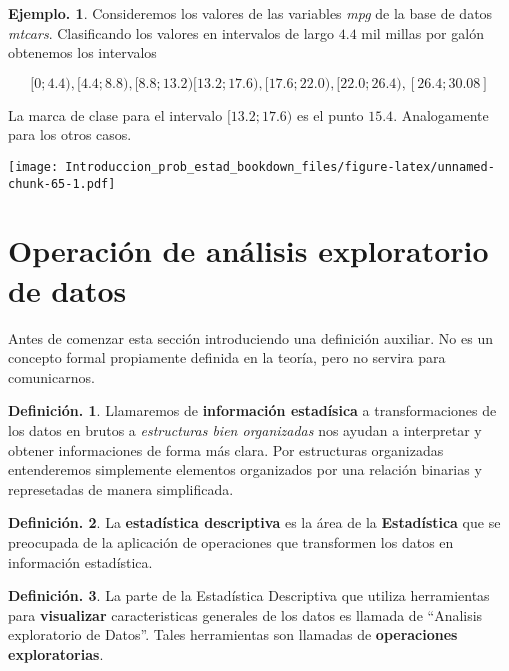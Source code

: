 \documentclass[]{book}
\theoremstyle{definition}
\newtheorem{definition}{Definición.}[chapter]
\theoremstyle{definition}
\newtheorem{example}{Ejemplo.}[chapter]
\theoremstyle{definition}
\theoremstyle{remark}
\begin{document}
\begin{example}
\protect\hypertarget{exm:unnamed-chunk-64}{}{\label{exm:unnamed-chunk-64} }Consideremos los valores de las variables \emph{mpg} de la
base de datos \emph{mtcars}. Clasificando los
valores en intervalos de largo \(4.4\) mil millas por galón
obtenemos los intervalos

\[ [0 ; 4.4), [4.4 ; 8.8), [8.8 ; 13.2) [13.2 ; 17.6),
[17.6 ; 22.0), [22.0 ; 26.4), [26.4 ; 30.08] \]

La marca de clase para el intervalo \([13.2 ; 17.6)\) es
el punto \(15.4\). Analogamente para los
otros casos.
\end{example}

\texttt{[image: Introduccion\_prob\_estad\_bookdown\_files/figure-latex/unnamed-chunk-65-1.pdf]}

\hypertarget{operaciuxf3n-de-anuxe1lisis-exploratorio-de-datos}{%
\section{Operación de análisis exploratorio de datos}\label{operaciuxf3n-de-anuxe1lisis-exploratorio-de-datos}}

Antes de comenzar esta sección introduciendo una definición auxiliar. No es un concepto formal propiamente definida en la teoría, pero no servira para comunicarnos.

\begin{definition}
\protect\hypertarget{def:unnamed-chunk-66}{}{\label{def:unnamed-chunk-66} }
Llamaremos de \textbf{información estadísica} a transformaciones de los datos en
brutos a \emph{estructuras bien organizadas} nos ayudan a interpretar y obtener
informaciones de forma más clara. Por estructuras organizadas entenderemos
simplemente elementos organizados por una relación binarias y represetadas de
manera simplificada.
\end{definition}

\begin{definition}
\protect\hypertarget{def:unnamed-chunk-67}{}{\label{def:unnamed-chunk-67} }
La \textbf{estadística descriptiva} es la área de la
\textbf{Estadística} que se preocupada de la
aplicación de operaciones que transformen
los datos en información estadística.
\end{definition}

\begin{definition}
\protect\hypertarget{def:unnamed-chunk-68}{}{\label{def:unnamed-chunk-68} }La parte de la Estadística Descriptiva que utiliza
herramientas para \textbf{visualizar}
caracteristicas generales de los datos es llamada de
``Analisis exploratorio de Datos''. Tales
herramientas son llamadas de \textbf{operaciones
exploratorias}.
\end{definition}
\end{document}
